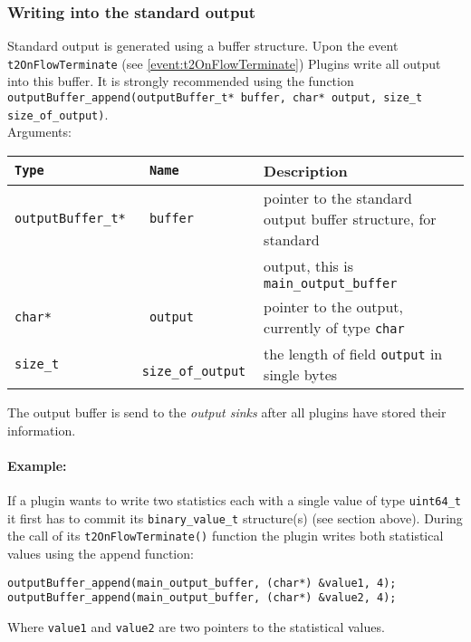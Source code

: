 \documentclass[documentation]{subfiles}
\begin{document}
\subsubsection{Writing into the standard output}
Standard output is generated using a buffer structure. Upon the event {\tt t2OnFlowTerminate} (see \ref{event:t2OnFlowTerminate}) Plugins write all output into this buffer. It is strongly recommended using the function {\tt outputBuffer\_append(outputBuffer\_t* buffer, char* output, size\_t size\_of\_output)}.\\
Arguments:
\begin{longtable}{>{\tt}l>{\tt}ll}
    \toprule
    {\bf Type}       & {\bf Name}       & {\bf Description} \\
    \midrule\endhead%
    outputBuffer\_t* & buffer           & pointer to the standard output buffer structure, for standard\\
                     &                  & output, this is {\tt main\_output\_buffer}\\
    char*            & output           & pointer to the output, currently of type {\tt char} \\
    size\_t          & size\_of\_output & the length of field {\tt output} in single bytes \\
    \bottomrule
\end{longtable}

The output buffer is send to the {\em output sinks} after all plugins have stored their information.

\paragraph{Example:}
If a plugin wants to write two statistics each with a single value of type {\tt uint64\_t} it first has to commit its {\tt binary\_value\_t} structure(s) (see section above). During the call of its {\tt t2OnFlowTerminate()} function the plugin writes both statistical values using the append function:
\begin{figure*}[!ht]
\centering
\begin{lstlisting}
outputBuffer_append(main_output_buffer, (char*) &value1, 4);
outputBuffer_append(main_output_buffer, (char*) &value2, 4);
\end{lstlisting}
\end{figure*}

Where {\tt value1} and {\tt value2} are two pointers to the statistical values.
\end{document}
